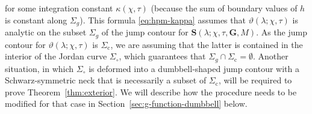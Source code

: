 for some integration constant $\kappa(\chi,\tau)$ (because the sum of boundary values of $h$ is constant along $\Sigma_g$).  This formula \eqref{eq:hpm-kappa} assumes that $\vartheta(\lambda;\chi,\tau)$ is analytic on the subset $\Sigma_g$ of the jump contour for $\mathbf{S}(\lambda;\chi,\tau,\mathbf{G},M)$.  As the jump contour for $\vartheta(\lambda;\chi,\tau)$ is $\Sigma_\mathrm{c}$, we are assuming that the latter is contained in the interior of the Jordan curve $\Sigma_\circ$, which guarantees that $\Sigma_g\cap\Sigma_\mathrm{c}=\emptyset$.  Another situation, in which $\Sigma_\circ$ is deformed into a dumbbell-shaped jump contour with a Schwarz-symmetric neck that is necessarily a subset of $\Sigma_\mathrm{c}$, will be required to prove Theorem~\ref{thm:exterior}.  We will describe how the procedure needs to be modified for that case in Section~\ref{sec:g-function-dumbbell} below.

